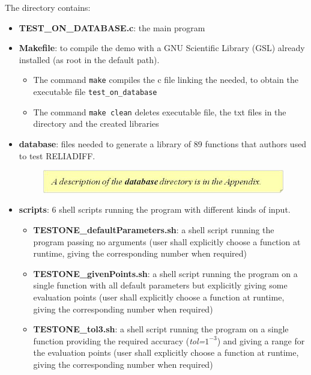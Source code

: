 \documentclass[10pt]{article}
\begin{document}
The directory contains:
      \begin{itemize}
      \item \textbf{TEST\_ON\_DATABASE.c}: the main program
      \item \textbf{Makefile}: to compile the demo with a GNU Scientific Library (GSL) already installed (as root in the default path).
		    \begin{itemize}
		      \item The command {\tt make} compiles the c file linking the needed, to obtain the executable file {\tt test\_on\_database}
		    \item The command {\tt make clean} deletes executable file, the txt files in the directory and the created libraries
		    \end{itemize}
      \item \textbf{database}: files needed to generate a library of 89 functions that authors used to test  RELIADIFF.

\begin{figure}[!h]
\begin{flushright}

\includegraphics[scale=0.8]{Immagine8}

\end{flushright}
\end{figure}

      \item \textbf{scripts}: 6 shell scripts running the program with different kinds of input.
		      \begin{itemize}
		      \item \textbf{TESTONE\_defaultParameters.sh}:	a shell script running the program passing no arguments (user shall explicitly choose a function at runtime, giving the corresponding number when required)

		      \item \textbf{TESTONE\_givenPoints.sh}:	a shell script running the program on a single function with all default parameters but explicitly giving some evaluation points (user shall explicitly choose a function at runtime, giving the corresponding number when required)

		      \item \textbf{TESTONE\_tol\textendash 3.sh}:	a shell script running the program on a single function providing the required accuracy (\emph{tol=$1^{-3}$}) and giving a range for the evaluation points (user shall explicitly choose a function at runtime, giving the corresponding number when required)


\end{itemize}
\end{itemize}
\end{document}
